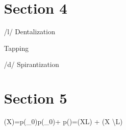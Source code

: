 \documentclass{article}
\begin{document}
\section{Section 4}
/l/ Dentalization
\begin{IPA}

\phonb{\phonfeat{\textipa{l}}
}{[\textipa{\|[\textltilde]}}{} {} }
\end{IPA}
\newline
Tapping
\begin{IPA}

 {} }
\end{IPA}
\newline
/d/ Spirantization
\begin{IPA}

\end{IPA}
\section{Section 5}
\delta (X)=p(\alpha_0)\neq p(\alpha_0)+ p(\alpha \beta)=\delta (X\cap L) + \delta (X \backslash L)
\end{document}
